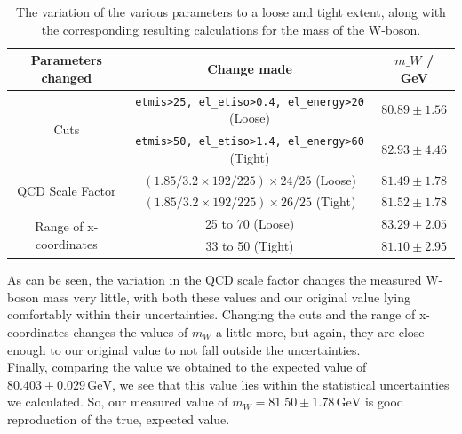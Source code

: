 \begin{table}
    \begin{tabular}{ccc}
        Parameters changed & Change made & $m\_W$ / GeV \\
        
        \hline
        \multirow{2}{*}{Cuts} & \texttt{etmis\textgreater{}25, el\_etiso\textgreater{}0.4, el\_energy\textgreater{}20} (Loose) & $80.89 \pm 1.56$ \\
        & \texttt{etmis\textgreater{}50, el\_etiso\textgreater{}1.4, el\_energy\textgreater{}60} (Tight) & $82.93 \pm 4.46$ \\
        
        \hline
        \multirow{2}{*}{QCD Scale Factor} & $(1.85/3.2 \times 192/225) \times 24/25$ (Loose) & $81.49 \pm 1.78$ \\
        & $(1.85/3.2 \times 192/225) \times 26/25$ (Tight) & $81.52 \pm 1.78$ \\
        
        \hline
        \multirow{2}{*}{Range of x-coordinates} & 25 to 70 (Loose) & $83.29 \pm 2.05$ \\
        & 33 to 50 (Tight) & $81.10 \pm 2.95$ \\
        \hline
    \end{tabular}
    \caption{The variation of the various parameters to a loose and tight extent, along with the corresponding resulting calculations for the mass of the W-boson.}
    \label{systerr}
\end{table}

\noindent As can be seen, the variation in the QCD scale factor changes the measured W-boson mass very little, with both these values and our original value lying comfortably within their uncertainties. Changing the cuts and the range of x-coordinates changes the values of $m_W$ a little more, but again, they are close enough to our original value to not fall outside the uncertainties.\\

\noindent Finally, comparing the value we obtained to the expected value of $80.403\pm0.029\,\text{GeV}$, we see that this value lies within the statistical uncertainties we calculated. So, our measured value of $m_W = 81.50\pm1.78\,\text{GeV}$ is good reproduction of the true, expected value.\\
